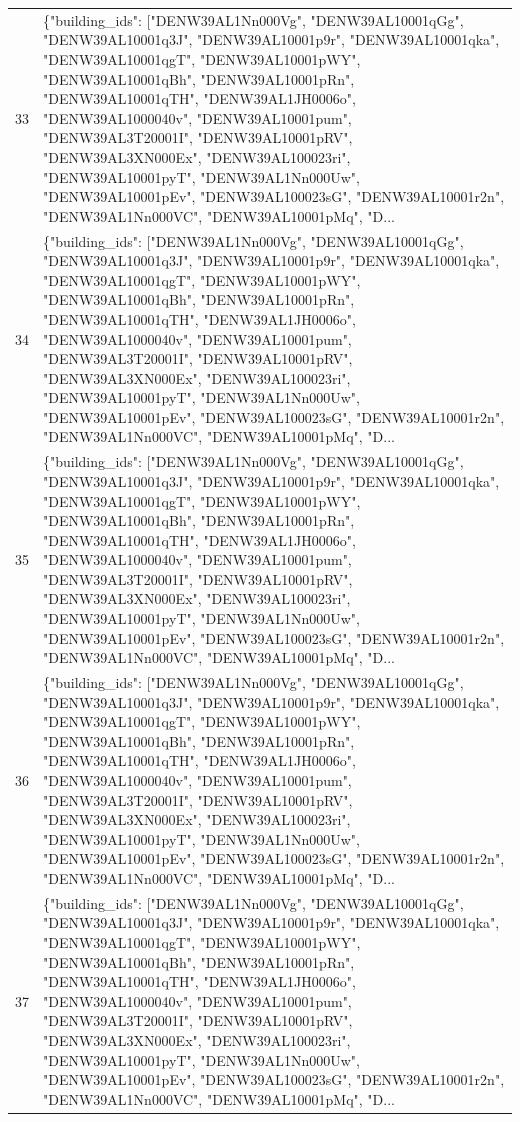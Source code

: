 \documentclass[a4paper,11pt]{article}
\begin{document}
\begin{table}[ht]
\begin{tabular}{r p{12cm}}
33 & \{"building\_ids": ["DENW39AL1Nn000Vg", "DENW39AL10001qGg", "DENW39AL10001q3J", "DENW39AL10001p9r", "DENW39AL10001qka", "DENW39AL10001qgT", "DENW39AL10001pWY", "DENW39AL10001qBh", "DENW39AL10001pRn", "DENW39AL10001qTH", "DENW39AL1JH0006o", "DENW39AL1000040v", "DENW39AL10001pum", "DENW39AL3T20001I", "DENW39AL10001pRV", "DENW39AL3XN000Ex", "DENW39AL100023ri", "DENW39AL10001pyT", "DENW39AL1Nn000Uw", "DENW39AL10001pEv", "DENW39AL100023sG", "DENW39AL10001r2n", "DENW39AL1Nn000VC", "DENW39AL10001pMq", "D... \\
34 & \{"building\_ids": ["DENW39AL1Nn000Vg", "DENW39AL10001qGg", "DENW39AL10001q3J", "DENW39AL10001p9r", "DENW39AL10001qka", "DENW39AL10001qgT", "DENW39AL10001pWY", "DENW39AL10001qBh", "DENW39AL10001pRn", "DENW39AL10001qTH", "DENW39AL1JH0006o", "DENW39AL1000040v", "DENW39AL10001pum", "DENW39AL3T20001I", "DENW39AL10001pRV", "DENW39AL3XN000Ex", "DENW39AL100023ri", "DENW39AL10001pyT", "DENW39AL1Nn000Uw", "DENW39AL10001pEv", "DENW39AL100023sG", "DENW39AL10001r2n", "DENW39AL1Nn000VC", "DENW39AL10001pMq", "D... \\
35 & \{"building\_ids": ["DENW39AL1Nn000Vg", "DENW39AL10001qGg", "DENW39AL10001q3J", "DENW39AL10001p9r", "DENW39AL10001qka", "DENW39AL10001qgT", "DENW39AL10001pWY", "DENW39AL10001qBh", "DENW39AL10001pRn", "DENW39AL10001qTH", "DENW39AL1JH0006o", "DENW39AL1000040v", "DENW39AL10001pum", "DENW39AL3T20001I", "DENW39AL10001pRV", "DENW39AL3XN000Ex", "DENW39AL100023ri", "DENW39AL10001pyT", "DENW39AL1Nn000Uw", "DENW39AL10001pEv", "DENW39AL100023sG", "DENW39AL10001r2n", "DENW39AL1Nn000VC", "DENW39AL10001pMq", "D... \\
36 & \{"building\_ids": ["DENW39AL1Nn000Vg", "DENW39AL10001qGg", "DENW39AL10001q3J", "DENW39AL10001p9r", "DENW39AL10001qka", "DENW39AL10001qgT", "DENW39AL10001pWY", "DENW39AL10001qBh", "DENW39AL10001pRn", "DENW39AL10001qTH", "DENW39AL1JH0006o", "DENW39AL1000040v", "DENW39AL10001pum", "DENW39AL3T20001I", "DENW39AL10001pRV", "DENW39AL3XN000Ex", "DENW39AL100023ri", "DENW39AL10001pyT", "DENW39AL1Nn000Uw", "DENW39AL10001pEv", "DENW39AL100023sG", "DENW39AL10001r2n", "DENW39AL1Nn000VC", "DENW39AL10001pMq", "D... \\
37 & \{"building\_ids": ["DENW39AL1Nn000Vg", "DENW39AL10001qGg", "DENW39AL10001q3J", "DENW39AL10001p9r", "DENW39AL10001qka", "DENW39AL10001qgT", "DENW39AL10001pWY", "DENW39AL10001qBh", "DENW39AL10001pRn", "DENW39AL10001qTH", "DENW39AL1JH0006o", "DENW39AL1000040v", "DENW39AL10001pum", "DENW39AL3T20001I", "DENW39AL10001pRV", "DENW39AL3XN000Ex", "DENW39AL100023ri", "DENW39AL10001pyT", "DENW39AL1Nn000Uw", "DENW39AL10001pEv", "DENW39AL100023sG", "DENW39AL10001r2n", "DENW39AL1Nn000VC", "DENW39AL10001pMq", "D... \\

\end{tabular}
\end{table}
\end{document}
